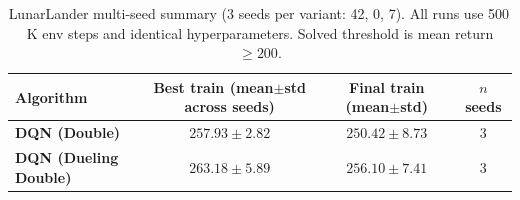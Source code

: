 \begin{table}[h]\centering\small
\caption{LunarLander multi-seed summary (3 seeds per variant: 42, 0, 7). All runs use 500\,K env steps and identical hyperparameters. Solved threshold is mean return $\geq 200$.}
\label{tab:lander_multiseed}
\begin{tabular}{lccc}
\toprule
Algorithm & Best train (mean$\pm$std across seeds) & Final train (mean$\pm$std) & $n$ seeds \\
\midrule
\textbf{DQN (Double)} & $\mathbf{257.93\pm2.82}$ & $250.42\pm8.73$ & 3 \\
\textbf{DQN (Dueling Double)} & $\mathbf{263.18\pm5.89}$ & $256.10\pm7.41$ & 3 \\
\bottomrule
\end{tabular}
\end{table}
